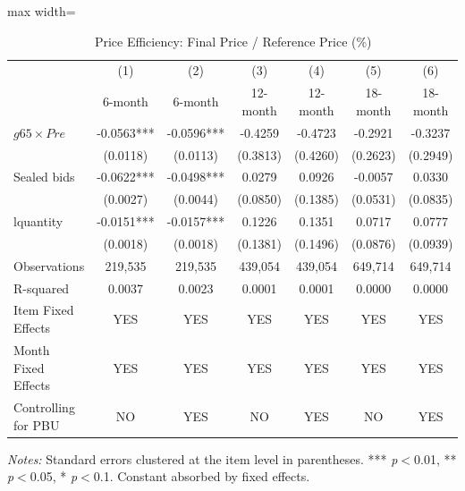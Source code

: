 \begin{table}[htbp]
\centering
\caption{Price Efficiency: Final Price / Reference Price (\%)}
\label{tab:efficiency}
\begin{adjustbox}{max width=\textwidth}
\begin{threeparttable}
\small
\begin{tabular}{lcccccc}
\toprule
 & (1) & (2) & (3) & (4) & (5) & (6) \\
 & 6-month & 6-month & 12-month & 12-month & 18-month & 18-month \\
\midrule
$g65 \times Pre$ & -0.0563*** & -0.0596*** & -0.4259 & -0.4723 & -0.2921 & -0.3237 \\
 & (0.0118) & (0.0113) & (0.3813) & (0.4260) & (0.2623) & (0.2949) \\
Sealed bids & -0.0622*** & -0.0498*** & 0.0279 & 0.0926 & -0.0057 & 0.0330 \\
 & (0.0027) & (0.0044) & (0.0850) & (0.1385) & (0.0531) & (0.0835) \\
lquantity & -0.0151*** & -0.0157*** & 0.1226 & 0.1351 & 0.0717 & 0.0777 \\
 & (0.0018) & (0.0018) & (0.1381) & (0.1496) & (0.0876) & (0.0939) \\
\midrule
Observations & 219,535 & 219,535 & 439,054 & 439,054 & 649,714 & 649,714 \\
R-squared & 0.0037 & 0.0023 & 0.0001 & 0.0001 & 0.0000 & 0.0000 \\
Item Fixed Effects & YES & YES & YES & YES & YES & YES \\
Month Fixed Effects & YES & YES & YES & YES & YES & YES \\
Controlling for PBU & NO & YES & NO & YES & NO & YES \\
\bottomrule
\end{tabular}
\begin{tablenotes}
\small
\item \textit{Notes:} Standard errors clustered at the item level in parentheses.
*** \textit{p}$<$0.01, ** \textit{p}$<$0.05, * \textit{p}$<$0.1.
Constant absorbed by fixed effects.
\end{tablenotes}
\end{threeparttable}
\end{adjustbox}
\end{table}
